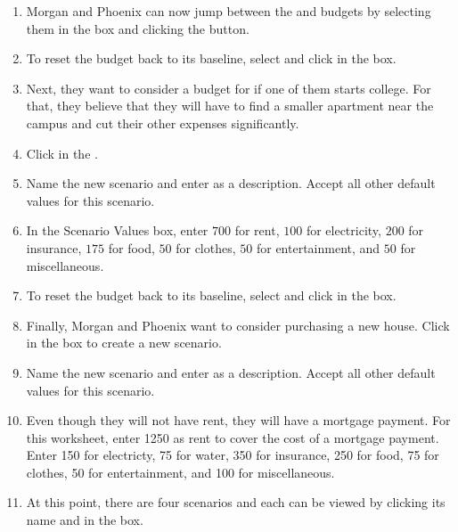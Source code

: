 \begin{enumerate}[resume]	
	
	\item Morgan and Phoenix can now jump between the  and  budgets by selecting them in the  box and clicking the  button.
	\item To reset the budget back to its baseline, select  and click  in the  box.
	\item Next, they want to consider a budget for if one of them starts college. For that, they believe that they will have to find a smaller apartment near the campus and cut their other expenses significantly.
	\item Click  in the .
	\item Name the new scenario  and enter  as a description. Accept all other default values for this scenario.
	\item In the Scenario Values box, enter $ 700 $ for rent, $ 100 $ for electricity, $ 200 $ for insurance, $ 175 $ for food, $ 50 $ for clothes, $ 50 $ for entertainment, and $ 50 $ for miscellaneous.
	\item To reset the budget back to its baseline, select  and click  in the  box.
	\item Finally, Morgan and Phoenix want to consider purchasing a new house. Click  in the  box to create a new scenario.
	\item Name the new scenario  and enter  as a description. Accept all other default values for this scenario.
	\item Even though they will not have rent, they will have a mortgage payment. For this worksheet, enter 1250 as rent to cover the cost of a mortgage payment. Enter 150 for electricty, 75 for water, 350 for insurance, 250 for food, 75 for clothes, 50 for entertainment, and 100 for miscellaneous.
	\item At this point, there are four scenarios and each can be viewed by clicking its name and  in the  box. 
	
\end{enumerate}


